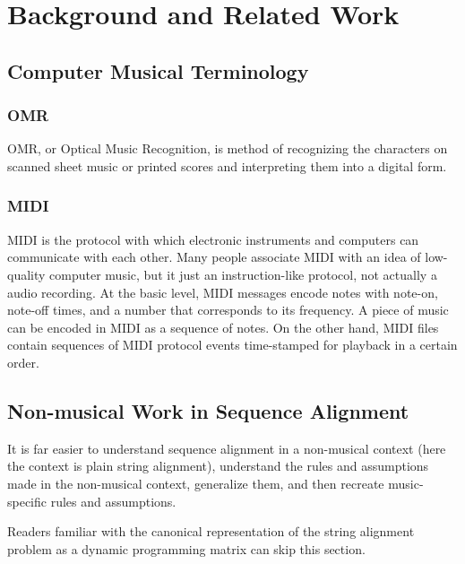\chapter{Background and Related Work}
\section{Computer Musical Terminology}

\subsection{OMR}
OMR, or Optical Music Recognition, is method of recognizing the characters on scanned sheet music or printed scores and interpreting them into a digital form. 

\subsection{MIDI}
MIDI is the protocol with which electronic instruments and computers can communicate with each other. Many people associate MIDI with an idea of low-quality computer music, but it  just an instruction-like protocol, not actually a audio recording. At the basic level, MIDI messages encode notes with note-on, note-off times, and a number that corresponds to its frequency. A piece of music can be encoded in MIDI as a sequence of notes. On the other hand, MIDI files contain sequences of MIDI protocol events time-stamped for playback in a certain order.

\section{Non-musical Work in Sequence Alignment}
It is far easier to understand sequence alignment in a non-musical context (here the context is plain string alignment), understand the rules and assumptions made in the non-musical context, generalize them, and then recreate music-specific rules and assumptions. 

Readers familiar with the canonical representation of the string alignment problem as a dynamic programming matrix can skip this section. 

